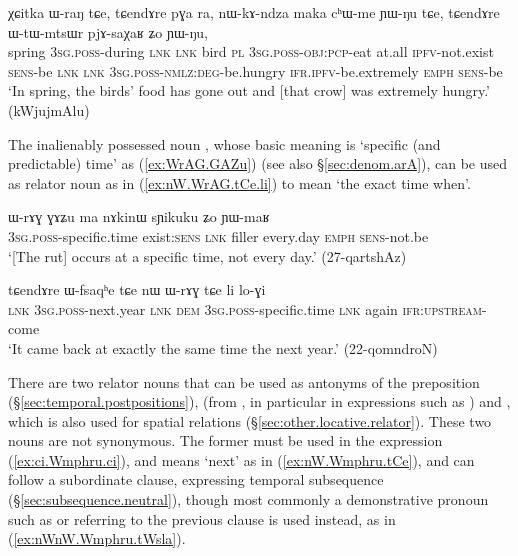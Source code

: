    \begin{exe}
\ex \label{ex:XCitka.WraN} 
\gll χɕitka ɯ-raŋ tɕe, tɕendɤre pɣa ra, nɯ-kɤ-ndza maka cʰɯ-me ɲɯ-ŋu tɕe, tɕendɤre ɯ-tɯ-mtsɯr pjɤ-saχaʁ ʑo ɲɯ-ŋu,  \\
spring \textsc{3sg}.\textsc{poss}-during \textsc{lnk} \textsc{lnk} bird \textsc{pl} \textsc{3sg}.\textsc{poss}-\textsc{obj}:\textsc{pcp}-eat at.all \textsc{ipfv}-not.exist \textsc{sens}-be \textsc{lnk} \textsc{lnk} \textsc{3sg}.\textsc{poss}-\textsc{nmlz}:\textsc{deg}-be.hungry \textsc{ifr}.\textsc{ipfv}-be.extremely \textsc{emph} \textsc{sens}-be \\
\glt `In spring, the birds' food has gone out and [that crow] was extremely hungry.' (kWjujmAlu)
\end{exe}

The inalienably possessed noun , whose basic meaning is `specific (and predictable) time' as (\ref{ex:WrAG.GAZu}) (see also §\ref{sec:denom.arA}), can be used as relator noun as in (\ref{ex:nW.WrAG.tCe.li}) to mean `the exact time when'.

\begin{exe}
\ex \label{ex:WrAG.GAZu}
\gll ɯ-rɤɣ ɣɤʑu ma nɤkinɯ sɲikuku ʑo ɲɯ-maʁ \\
\textsc{3sg}.\textsc{poss}-specific.time exist:\textsc{sens} \textsc{lnk} filler every.day \textsc{emph} \textsc{sens}-not.be \\
\glt `[The rut] occurs at a specific time, not every day.' (27-qartshAz) 
\end{exe}

\begin{exe}
\ex \label{ex:nW.WrAG.tCe.li}
\gll tɕendɤre ɯ-fsaqʰe tɕe nɯ ɯ-rɤɣ tɕe li lo-ɣi \\
\textsc{lnk} \textsc{3sg}.\textsc{poss}-next.year \textsc{lnk} \textsc{dem}  \textsc{3sg}.\textsc{poss}-specific.time \textsc{lnk} again \textsc{ifr}:\textsc{upstream}-come \\
\glt `It came back at exactly the same time the next year.' (22-qomndroN) 
\end{exe}


There are two relator nouns that can be used as antonyms of the preposition  (§\ref{sec:temporal.postpositions}),   (from , in particular in expressions such as ) and , which is also used for spatial relations (§\ref{sec:other.locative.relator}). These two nouns are not synonymous. The former must be used in the expression  (\ref{ex:ci.Wmphru.ci}), and means `next' as in (\ref{ex:nW.Wmphru.tCe}), and can follow a subordinate clause, expressing temporal subsequence (§\ref{sec:subsequence.neutral}), though most commonly a demonstrative pronoun such as  or  referring to the previous clause is used instead, as in (\ref{ex:nWnW.Wmphru.tWsla}).

